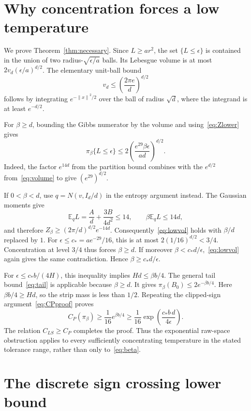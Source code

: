 \documentclass[11pt,letterpaper]{article}
\numberwithin{equation}{section}
\theoremstyle{remark}
\newcommand{\E}{\mathbb E}
\newcommand{\1}{\mathbf 1}
\newcommand{\norm}[1]{\left\lVert#1\right\rVert}
\begin{document}
\section{Why concentration forces a low temperature}\label{sec:necessary}

We prove Theorem~\ref{thm:necessary}. Since $L\ge ar^2$, the set $\{L\le\epsilon\}$ is contained in the union of two radius-$\sqrt{\epsilon/a}$ balls. Its Lebesgue volume is at most $2v_d(\epsilon/a)^{d/2}$. The elementary unit-ball bound
\begin{equation}\label{eq:volume}
 v_d\le\left(\frac{2\pi e}{d}\right)^{d/2}
\end{equation}
follows by integrating $e^{-\norm x^2/2}$ over the ball of radius $\sqrt d$, where the integrand is at least $e^{-d/2}$.

For $\beta\ge d$, bounding the Gibbs numerator by the volume and using~\eqref{eq:Zlower} gives
\begin{equation}\label{eq:lowvol}
 \pi_\beta\{L\le\epsilon\}
 \le2\left(\frac{e^{29}\beta\epsilon}{ad}\right)^{d/2}.
\end{equation}
Indeed, the factor $e^{14d}$ from the partition bound combines with the $e^{d/2}$ from~\eqref{eq:volume} to give $(e^{29})^{d/2}$.

If $0<\beta<d$, use $q=N(v,I_d/d)$ in the entropy argument instead. The Gaussian moments give
\[
 \E_qL=\frac Ad+\frac{3B}{4d^2}\le14,
 \qquad \beta\E_qL\le14d,
\]
and therefore
$Z_\beta\ge(2\pi/d)^{d/2}e^{-14d}$.
Consequently~\eqref{eq:lowvol} holds with $\beta/d$ replaced by $1$. For $\epsilon\le c_*=ae^{-29}/16$, this is at most $2(1/16)^{d/2}<3/4$. Concentration at level $3/4$ thus forces $\beta\ge d$. If moreover $\beta<c_*d/\epsilon$,~\eqref{eq:lowvol} again gives the same contradiction. Hence $\beta\ge c_*d/\epsilon$.

For $\epsilon\le c_*b/(4H)$, this inequality implies $Hd\le\beta b/4$. The general tail bound~\eqref{eq:tail} is applicable because $\beta\ge d$. It gives
$\pi_\beta(B_0)\le2e^{-\beta b/4}$.
Here $\beta b/4\ge Hd$, so the strip mass is less than $1/2$. Repeating the clipped-sign argument~\eqref{eq:CPproof} proves
\[
 C_P(\pi_\beta)\ge\frac1{16}e^{\beta b/4}
 \ge\frac1{16}\exp\!\left(\frac{c_*b\,d}{4\epsilon}\right).
\]
The relation $C_{LS}\ge C_P$ completes the proof. Thus the exponential raw-space obstruction applies to every sufficiently concentrating temperature in the stated tolerance range, rather than only to~\eqref{eq:beta}.

\section{The discrete sign crossing lower bound}\label{sec:mala}
\end{document}

